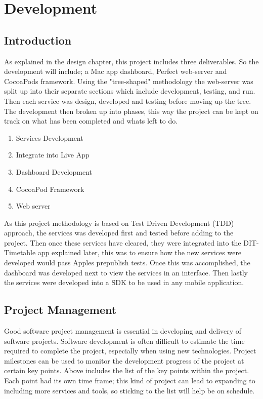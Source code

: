 \chapter{Development}

\label{ch:conclusions}

\section{Introduction}

As explained in the design chapter, this project includes three deliverables. So the development will include; a Mac app dashboard, Perfect web-server and CocoaPods framework. Using the "tree-shaped" methodology the web-server was split up into their separate sections which include development, testing, and run. Then each service was design, developed and testing before moving up the tree. The development then broken up into phases, this way the project can be kept on track on what has been completed and whats left to do.

\begin{enumerate}
  \item Services Development
  \item Integrate into Live App
  \item Dashboard Development
  \item CocoaPod Framework 
  \item Web server 
\end{enumerate}

As this project methodology is based on Test Driven Development (TDD) approach, the services was developed first and tested before adding to the project. Then once these services have cleared, they were integrated into the DIT-Timetable app explained later, this was to ensure how the new services were developed would pass Apples prepublish tests. Once this was accomplished, the dashboard was developed next to view the services in an interface. Then lastly the services were developed into a SDK to be used in any mobile application.

\section{Project Management}

Good software project management is essential in developing and delivery of software projects. Software development is often difficult to estimate the time required to complete the project, especially when using new technologies. Project milestones can be used to monitor the development progress of the project at certain key points. Above includes the list of the key points within the project. Each point had its own time frame; this kind of project can lead to expanding to including more services and tools, so sticking to the list will help be on schedule.

